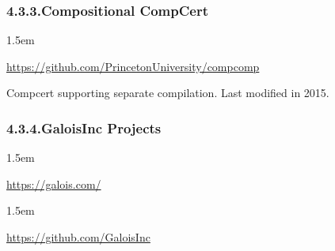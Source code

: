 \documentclass[12pt,twoside]{article}
\begin{document}
\subsubsection{4.3.3.\hspace*{0.5em}Compositional CompCert}%

\begin{mddefinitions}%


\begin{mdbmarginx}{}{}{}{1.5em}%
\begin{mddefdata}%
\href{https://github.com/PrincetonUniversity/compcomp}{{\ttfamily https://\hspace{0pt}github.\hspace{0pt}com/\hspace{0pt}PrincetonUniversity/\hspace{0pt}compcomp}}%
\end{mddefdata}%
\end{mdbmarginx}%
\end{mddefinitions}%

\noindent{}Compcert supporting separate compilation. Last modified in 2015.%

\subsubsection{4.3.4.\hspace*{0.5em}GaloisInc Projects}%

\begin{mddefinitions}%


\begin{mdbmarginx}{}{}{}{1.5em}%
\begin{mddefdata}%
\href{https://galois.com/}{{\ttfamily https://\hspace{0pt}galois.\hspace{0pt}com/\hspace{0pt}}}
\end{mddefdata}%
\end{mdbmarginx}%


\begin{mdbmarginx}{}{}{}{1.5em}%
\begin{mddefdata}%
\href{https://github.com/GaloisInc}{{\ttfamily https://\hspace{0pt}github.\hspace{0pt}com/\hspace{0pt}GaloisInc}}%
\end{mddefdata}%
\end{mdbmarginx}%
\end{mddefinitions}%
\end{document}
